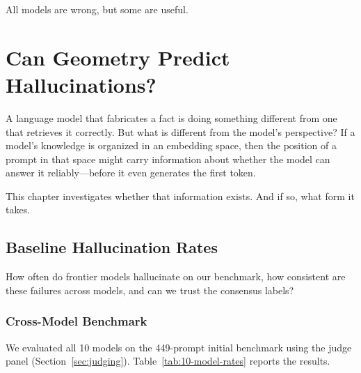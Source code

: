 \begin{savequote}[75mm]
All models are wrong, but some are useful.
\end{savequote}

\chapter{Can Geometry Predict Hallucinations?}
\label{ch:geo-predict-hallucination}

A language model that fabricates a fact is doing something different from one that retrieves it correctly. But what is different from the model's perspective? If a model's knowledge is organized in an embedding space, then the position of a prompt in that space might carry information about whether the model can answer it reliably---before it even generates the first token. 

This chapter investigates whether that information exists. And if so, what form it takes.

\section{Baseline Hallucination Rates}
\label{sec:baseline-rates}

How often do frontier models hallucinate on our benchmark, how consistent are these failures across models, and can we trust the consensus labels?

\subsection{Cross-Model Benchmark}
\label{sec:cross-model}

We evaluated all 10 models on the 449-prompt initial benchmark using the judge panel (Section~\ref{sec:judging}). Table~\ref{tab:10-model-rates} reports the results.

